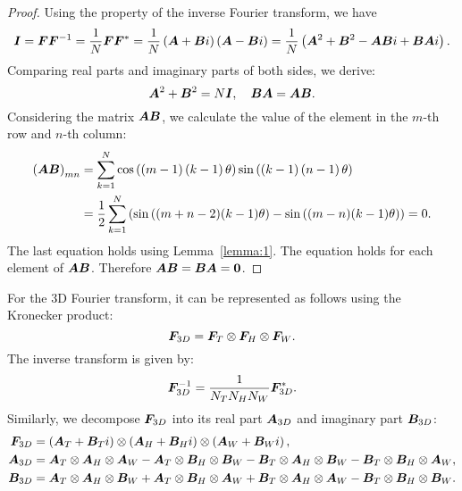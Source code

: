 \begin{proof}
Using the property of the inverse Fourier transform, we have
\begin{equation}
    {\bm{I}} = {\bm{F}}{\bm{F}}^{-1} = \frac{1}{N} {\bm{F}} {\bm{F}}^{\ast} = \frac{1}{N}\left({\bm{A}} + {\bm{B}} i\right)\left({\bm{A}} - {\bm{B}} i\right) = \frac{1}{N}\left({\bm{A}}^2+{\bm{B}}^2-{\bm{A}}{\bm{B}} i+{\bm{B}}{\bm{A}} i\right).
\end{equation}
Comparing real parts and imaginary parts of both sides, we derive:
\begin{equation}
    {\bm{A}}^2+{\bm{B}}^2=N{\bm{I}},\quad {\bm{B}}{\bm{A}}={\bm{A}}{\bm{B}}.
\end{equation}
Considering the matrix ${\bm{A}}{\bm{B}}$, we calculate the value of the element in the $m$-th row and $n$-th column:
\begin{equation}
\begin{split}
    \left({\bm{A}}{\bm{B}}\right)_{mn} &=\sum_{k=1}^{N}\cos\left( \left(m-1\right)\left(k-1\right)\theta \right)\sin\left( \left(k-1\right)\left(n-1\right)\theta \right) \\
    &=\frac{1}{2}\sum_{k=1}^{N}\left( \sin\left((m+n-2)(k-1)\theta\right) - \sin\left((m-n)(k-1)\theta\right) \right) = 0.
\end{split}
\end{equation}
The last equation holds using Lemma~\ref{lemma:1}. The equation holds for each element of ${\bm{A}}{\bm{B}}$.
Therefore ${\bm{A}}{\bm{B}}={\bm{B}}{\bm{A}}=\mathbf{0}$.
\end{proof}
For the 3D Fourier transform, it can be represented as follows using the Kronecker product:
\begin{equation}
    {\bm{F}}_{3D} = {\bm{F}}_{T} \otimes {\bm{F}}_{H} \otimes {\bm{F}}_{W}.
\end{equation}
The inverse transform is given by:
\begin{equation}
    {\bm{F}}_{3D}^{-1}  = \frac{1}{N_TN_HN_W} {\bm{F}}_{3D}^\ast.
\end{equation}
Similarly, we decompose ${\bm{F}}_{3D}$ into its real part ${\bm{A}}_{3D}$ and imaginary part ${\bm{B}}_{3D}$:
\begin{equation}
\begin{split}
    {\bm{F}}_{3D} & =\left({\bm{A}}_T+{\bm{B}}_Ti\right) \otimes \left({\bm{A}}_H+{\bm{B}}_Hi\right) \otimes \left({\bm{A}}_W+{\bm{B}}_Wi\right), \\
    {\bm{A}}_{3D} &= {\bm{A}}_T\otimes{\bm{A}}_H\otimes{\bm{A}}_W
    -{\bm{A}}_T\otimes{\bm{B}}_H\otimes{\bm{B}}_W
    -{\bm{B}}_T\otimes{\bm{A}}_H\otimes{\bm{B}}_W
    -{\bm{B}}_T\otimes{\bm{B}}_H\otimes{\bm{A}}_W, \\
    {\bm{B}}_{3D} &= {\bm{A}}_T\otimes{\bm{A}}_H\otimes{\bm{B}}_W
    +{\bm{A}}_T\otimes{\bm{B}}_H\otimes{\bm{A}}_W
    +{\bm{B}}_T\otimes{\bm{A}}_H\otimes{\bm{A}}_W
    -{\bm{B}}_T\otimes{\bm{B}}_H\otimes{\bm{B}}_W.
\end{split}
\end{equation}
